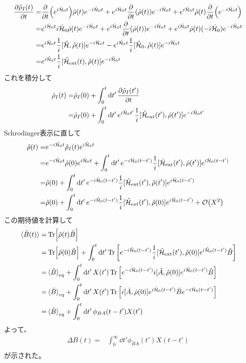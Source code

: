 \documentclass{ltjsarticle}
\begin{document}
\begin{align}
  \pdv{\hat{\rho}_I(t)}{t}=&\pdv{t}(e^{i\hat{\mathcal{H}}_0t})\hat{\rho}(t) e^{-i\hat{\mathcal{H}}_0t}+e^{i\hat{\mathcal{H}}_0t}\pdv{t}(\hat{\rho}(t)) e^{-i\hat{\mathcal{H}}_0t}+e^{i\hat{\mathcal{H}}_0t}\hat{\rho}(t) \pdv{t}(e^{-i\hat{\mathcal{H}}_0t})\\
  =&e^{i\hat{\mathcal{H}}_0t}i\hat{\mathcal{H}}_0\hat{\rho}(t) e^{-i\hat{\mathcal{H}}_0t}+e^{i\hat{\mathcal{H}}_0t}\pdv{t}(\hat{\rho}(t)) e^{-i\hat{\mathcal{H}}_0t}+e^{i\hat{\mathcal{H}}_0t}\hat{\rho}(t) (-i\hat{\mathcal{H}}_0)e^{-i\hat{\mathcal{H}}_0t}\\
  =&e^{i\hat{\mathcal{H}}_0t}\frac{1}{i}[\hat{\mathcal{H}},\hat{\rho}(t)]e^{-i\hat{\mathcal{H}}_0t}-e^{i\hat{\mathcal{H}}_0t}\frac{1}{i}[\hat{\mathcal{H}}_0,\hat{\rho}(t)]e^{-i\hat{\mathcal{H}}_0t}\\
  =&e^{i\hat{\mathcal{H}}_0t}\frac{1}{i}[\hat{\mathcal{H}}_{\textrm{ext}}(t),\hat{\rho}(t)]e^{-i\hat{\mathcal{H}}_0t}
\end{align}
これを積分して
\begin{align}
  \hat{\rho}_I(t)=&\hat{\rho}_I(0)+\int_0^t\dd{t'}\pdv{\hat{\rho}_I(t')}{t}\\
  =&\hat{\rho}_I(0)+\int_0^t\dd{t'}e^{i\hat{\mathcal{H}}_0t'}\frac{1}{i}[\hat{\mathcal{H}}_{\textrm{ext}}(t'),\hat{\rho}(t')]e^{-i\hat{\mathcal{H}}_0t'}\\
\end{align}
Schrodinger表示に直して
\begin{align}
  \hat{\rho}(t)=&e^{-i\hat{\mathcal{H}}_0t}\hat{\rho}_I(t)e^{i\hat{\mathcal{H}}_0t}\\
  =&e^{-i\hat{\mathcal{H}}_0t}\hat{\rho}(0)e^{i\hat{\mathcal{H}}_0t}+\int_0^t\dd{t'}e^{-i\hat{\mathcal{H}}_0(t-t')}\frac{1}{i}[\hat{\mathcal{H}}_{\textrm{ext}}(t'),\hat{\rho}(t')]e^{i\hat{\mathcal{H}}_0(t-t')}\\
  =&\hat{\rho}(0)+\int_0^t\dd{t'}e^{-i\hat{\mathcal{H}}_0(t-t')}\frac{1}{i}[\hat{\mathcal{H}}_{\textrm{ext}}(t'),\hat{\rho}(t')]e^{i\hat{\mathcal{H}}_0(t-t')}\\
  =&\hat{\rho}(0)+\int_0^t\dd{t'}e^{-i\hat{\mathcal{H}}_0(t-t')}\frac{1}{i}[\hat{\mathcal{H}}_{\textrm{ext}}(t'),\hat{\rho}(0)]e^{i\hat{\mathcal{H}}_0(t-t')}+\order{X^2}\\
\end{align}
この期待値を計算して
\begin{align}
  \ev*{\hat{B}(t)}=&\Tr[\hat{\rho}(t)\hat{B}]\\
  =&\Tr[\hat{\rho}(0)\hat{B}]+\int_0^t\dd{t'}\Tr\left[e^{-i\hat{\mathcal{H}}_0(t-t')}\frac{1}{i}[\hat{\mathcal{H}}_{\textrm{ext}}(t'),\hat{\rho}(0)]e^{i\hat{\mathcal{H}}_0(t-t')}\hat{B}\right]\\
  =&\ev*{\hat{B}}_{eq}+\int_0^t\dd{t'}X(t')\Tr\left[e^{-i\hat{\mathcal{H}}_0(t-t')}i[\hat{A},\hat{\rho}(0)]e^{i\hat{\mathcal{H}}_0(t-t')}\hat{B}\right]\\
  =&\ev*{\hat{B}}_{eq}+\int_0^t\dd{t'}X(t')\Tr\left[i[\hat{A},\hat{\rho}(0)]e^{i\hat{\mathcal{H}}_0(t-t')}\hat{B}e^{-i\hat{\mathcal{H}}_0(t-t')}\right]\\
  =&\ev*{\hat{B}}_{eq}+\int_0^t\dd{t'}\phi_{BA}(t-t')X(t')\\
\end{align}
よって、
\begin{align}
  \Delta B(t)=&\int^\infty_0\dd{t'}\phi_{BA}(t')X(t-t')\\
\end{align}
が示された。
\end{document}
